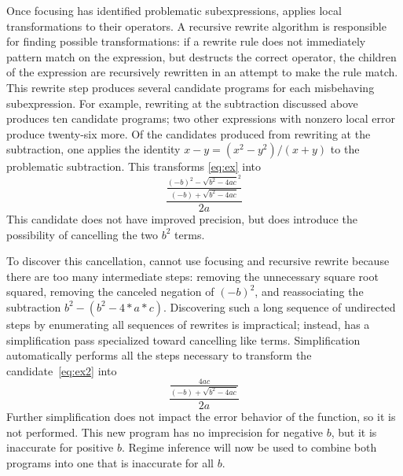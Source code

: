 \documentclass[paper.tex]{subfiles}
\begin{document}
Once focusing has identified problematic subexpressions, \casio
applies local transformations to their operators.  A recursive rewrite
algorithm is responsible for finding possible transformations: if a
rewrite rule does not immediately pattern match on the expression, but
destructs the correct operator, the children of the expression are
recursively rewritten in an attempt to make the rule match.  This
rewrite step produces several candidate programs for each misbehaving
subexpression.  For example, rewriting at the subtraction discussed
above produces ten candidate programs; two other expressions with
nonzero local error produce twenty-six more.  Of the candidates
produced from rewriting at the subtraction, one applies the identity
$x - y = (x^2 - y^2) / (x + y)$ to the problematic subtraction.  This
transforms \eqref{eq:ex} into
\begin{equation} \label{eq:ex2}
  \frac{\frac{(-b)^2 - \sqrt{b^2 - 4ac}^2}
             {(-b) + \sqrt{b^2 - 4ac}}}
       {2a}
\end{equation}
This candidate does not have improved precision, but does introduce
the possibility of cancelling the two $b^2$ terms.

To discover this cancellation, \casio cannot use focusing and
recursive rewrite because there are too many intermediate steps:
removing the unnecessary square root squared, removing the canceled
negation of $(-b)^2$, and reassociating the subtraction $b^2 - (b^2 -
4*a*c)$.  Discovering such a long sequence of undirected steps by
enumerating all sequences of rewrites is impractical; instead, \casio
has a simplification pass specialized toward cancelling like terms.
Simplification automatically performs all the steps necessary to
transform the candidate~\eqref{eq:ex2} into
\begin{equation} \label{eq:ex3}
  \frac{\frac{4ac} {(-b) + \sqrt{b^2 - 4ac}}} {2a}
\end{equation}
Further simplification does not impact the error behavior of the
function, so it is not performed.  This new program has no imprecision
for negative $b$, but it is inaccurate for positive $b$.  Regime
inference will now be used to combine both programs into one that is
inaccurate for all $b$.
\end{document}
